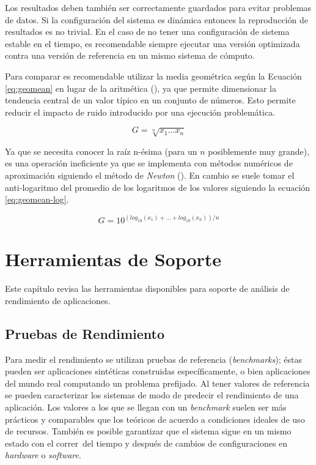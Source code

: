 \documentclass[a4paper]{report}
\begin{document}
Los resultados deben también ser correctamente guardados para evitar
problemas de datos. Si la configuración del sistema es dinámica entonces la
reproducción de resultados es no trivial. En el caso de no tener una
configuración de sistema estable en el tiempo, es recomendable siempre
ejecutar una versión optimizada contra una versión de referencia en un mismo
sistema de cómputo.

\bigskip

Para comparar es recomendable utilizar la media geométrica según la Ecuación \ref{eq:geomean} en lugar de la aritmética (\cite{how-not-to-lie}), ya que permite dimensionar la tendencia central de un valor típico en un conjunto de números. Esto permite reducir el impacto de ruido introducido por una ejecución problemática.

\begin{equation}
\label{eq:geomean}
G = \sqrt[n]{x_{1} \ldots x_{n}}
\end{equation}

Ya que se necesita conocer la raíz n-ésima (para un $ n $ posiblemente muy grande), es una operación ineficiente ya que se implementa con métodos numéricos de aproximación
siguiendo el método de {\it Newton} (\cite{numerical-analysis}). En cambio se suele tomar el anti-logaritmo del promedio de los logaritmos de los valores siguiendo la ecuación \ref{eq:geomean-log}.

\begin{equation}
\label{eq:geomean-log}
G = 10 ^{( log _{10} (x_{1}) + \ldots + log _{10} (x_{n}) ) / n}
\end{equation}

\chapter{Herramientas de Soporte}\label{chapter:tools}

Este capítulo revisa las herramientas disponibles para soporte de análisis
de rendimiento de aplicaciones.

\section{Pruebas de Rendimiento}

Para medir el rendimiento se utilizan pruebas de referencia ({\em benchmarks}); éstas pueden ser aplicaciones sintéticas construidas específicamente, o bien aplicaciones del mundo real computando un problema prefijado. Al tener valores de referencia se pueden caracterizar los sistemas de modo de predecir el rendimiento de una aplicación.
Los valores a los que se llegan con un {\it benchmark} suelen ser más prácticos y
comparables que los teóricos de acuerdo a condiciones ideales de uso de recursos.
También es posible garantizar que el sistema sigue en un mismo estado con el correr\
del tiempo y después de cambios de configuraciones en {\it hardware} o {\it software}.
\end{document}
